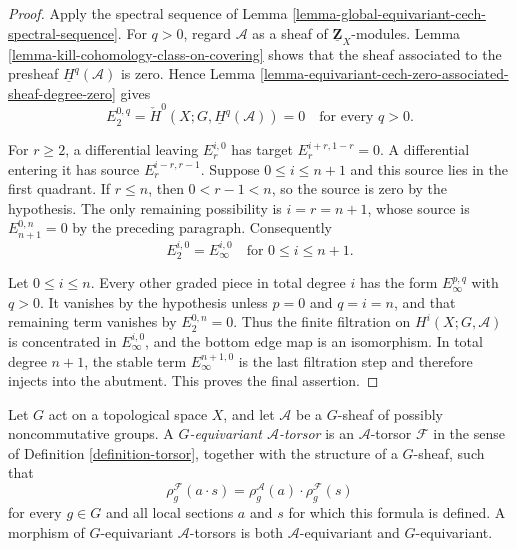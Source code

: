 \begin{proof}
Apply the spectral sequence of Lemma
\ref{lemma-global-equivariant-cech-spectral-sequence}. For $q>0$, regard
$\mathcal A$ as a sheaf of $\underline{\mathbf Z}_X$-modules. Lemma
\ref{lemma-kill-cohomology-class-on-covering} shows that the sheaf
associated to the presheaf $\underline H^q(\mathcal A)$ is zero. Hence
Lemma \ref{lemma-equivariant-cech-zero-associated-sheaf-degree-zero}
gives
$$
E_2^{0,q}=\check H^0(X;G,\underline H^q(\mathcal A))=0
\quad\text{for every }q>0.
$$

For $r\geq 2$, a differential leaving $E_r^{i,0}$ has target
$E_r^{i+r,1-r}=0$. A differential entering it has source
$E_r^{i-r,r-1}$. Suppose $0\leq i\leq n+1$ and this source lies in the
first quadrant. If $r\leq n$, then $0<r-1<n$, so the source is zero by
the hypothesis. The only remaining possibility is
$i=r=n+1$, whose source is $E_{n+1}^{0,n}=0$ by the preceding
paragraph. Consequently
$$
E_2^{i,0}=E_\infty^{i,0}
\quad\text{for }0\leq i\leq n+1.
$$

Let $0\leq i\leq n$. Every other graded piece in total degree $i$ has
the form $E_\infty^{p,q}$ with $q>0$. It vanishes by the hypothesis
unless $p=0$ and $q=i=n$, and that remaining term vanishes by
$E_2^{0,n}=0$. Thus the finite filtration on
$H^i(X;G,\mathcal A)$ is concentrated in $E_\infty^{i,0}$, and the
bottom edge map is an isomorphism. In total degree $n+1$, the stable
term $E_\infty^{n+1,0}$ is the last filtration step and therefore
injects into the abutment. This proves the final assertion.
\end{proof}


\begin{definition}
\label{definition-equivariant-torsor}
Let $G$ act on a topological space $X$, and let $\mathcal A$ be a
$G$-sheaf of possibly noncommutative groups. A
{\it $G$-equivariant $\mathcal A$-torsor} is an $\mathcal A$-torsor
$\mathcal F$ in the sense of Definition \ref{definition-torsor},
together with the structure of a $G$-sheaf, such that
$$
\rho_g^{\mathcal F}(a \cdot s) =
\rho_g^{\mathcal A}(a) \cdot \rho_g^{\mathcal F}(s)
$$
for every $g \in G$ and all local sections $a$ and $s$ for which this
formula is defined. A morphism of $G$-equivariant $\mathcal A$-torsors
is both $\mathcal A$-equivariant and $G$-equivariant.
\end{definition}


